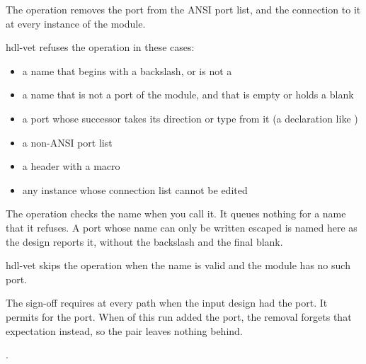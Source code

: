 \begin{entry}{}
\item[Writes] The operation removes the port from the ANSI port list, and the connection
  to it at every instance of the module.
\item[Refused] hdl-vet refuses the operation in these cases:
  \begin{itemize}
  \item a name that begins with a backslash, or is not a 
  \item a name that is not a port of the module, and that is empty or holds a blank
  \item a port whose successor takes its direction or type from it (a declaration like
    )
  \item a non-ANSI port list
  \item a header with a macro
  \item any instance whose connection list cannot be edited
  \end{itemize}
  The operation checks the name when you call it. It queues nothing for a name that it
  refuses. A port whose name can only be written escaped is named here as the design
  reports it, without the backslash and the final blank.
\item[Again] hdl-vet skips the operation when the name is valid and the module has no
  such port.
\item[Sign-off] The sign-off requires  at every path when the input
  design had the port. It permits  for the port. When
   of this run added the port, the removal forgets that
  expectation instead, so the pair leaves nothing behind.
\item[Example] .
\end{entry}

